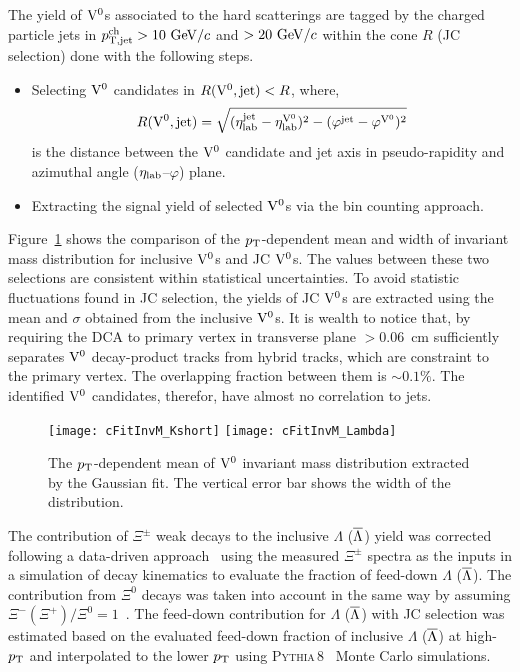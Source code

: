 The yield of ${\rm V}^{0}$s associated to the hard scatterings are tagged by the charged particle jets in $\pT[jet]^{\rm ch}>10~\GeVc$ and $>20~{\rm GeV/}c$ within the cone $R$ (JC selection) done with the following steps.
\begin{itemize}
\item Selecting ${\rm V}^{0}$ candidates in $R({\rm V}^{0},{\rm jet})<R$, where,
\begin{equation}
R({\rm V}^{0},{\rm jet})=\sqrt{(\eta_{\rm lab}^{\rm jet}-\eta_{\rm lab}^{{\rm V}^{0}})^{2}-(\varphi^{\rm jet}-\varphi^{{\rm V}^{0}})^{2}}
\end{equation}
is  the distance between the ${\rm V}^{0}$ candidate and jet axis in pseudo-rapidity and azimuthal angle ($\eta_{\rm lab}$--$\varphi$) plane.
\item Extracting the signal yield of selected ${\rm V}^{0}$s via the bin counting approach.
\end{itemize}
Figure~\ref{fig:c05V0FitInvM} shows the comparison of the $\pT$-dependent mean and width of invariant mass distribution for inclusive ${\rm V}^{0}$s and JC ${\rm V}^{0}$s.
The values between these two selections are consistent within statistical uncertainties.
To avoid statistic fluctuations found in JC selection, the yields of JC ${\rm V}^{0}$s are extracted using the mean and $\sigma$ obtained from the inclusive ${\rm V}^{0}$s.
It is wealth to notice that, by requiring the DCA to primary vertex in transverse plane $>0.06$~cm sufficiently separates ${\rm V}^{0}$ decay-product tracks from hybrid tracks, which are constraint to the primary vertex.
The overlapping fraction between them is $\sim 0.1\%$.
The identified ${\rm V}^{0}$ candidates, therefor, have almost no correlation to jets.


\begin{figure}[htb]
\begin{center}
\texttt{[image: cFitInvM\_Kshort]}
\texttt{[image: cFitInvM\_Lambda]}
\caption{The $\pT$-dependent mean of ${\rm V}^{0}$ invariant mass distribution extracted by the Gaussian fit. The vertical error bar shows the width of the distribution.}
\label{fig:c05V0FitInvM}
\end{center}
\end{figure}

The contribution of $\Xi^{\pm}$ weak decays to the inclusive $\Lambda$ ($\overline{\Lambda}$) yield was corrected following a data-driven approach~\cite{Abelev:2013haa} using the measured $\Xi^{\pm}$ spectra as the inputs in a simulation of decay kinematics to evaluate the fraction of feed-down $\Lambda$ ($\overline{\Lambda}$).
The contribution from $\Xi^{0}$ decays was taken into account in the same way by assuming $\Xi^{-}(\Xi^{+})/\Xi^{0}=1$~\cite{Abelev:2013haa,Roesler:2000he,Skands:2010ak}.
The feed-down contribution for $\Lambda$ ($\overline{\Lambda}$) with JC selection was estimated based on the evaluated feed-down fraction of inclusive $\Lambda$ ($\overline{\Lambda}$) at high-$\pT$ and interpolated to the lower $\pT$ using \textsc{Pythia}\,8~\cite{Sjostrand:2007gs} Monte Carlo simulations.

